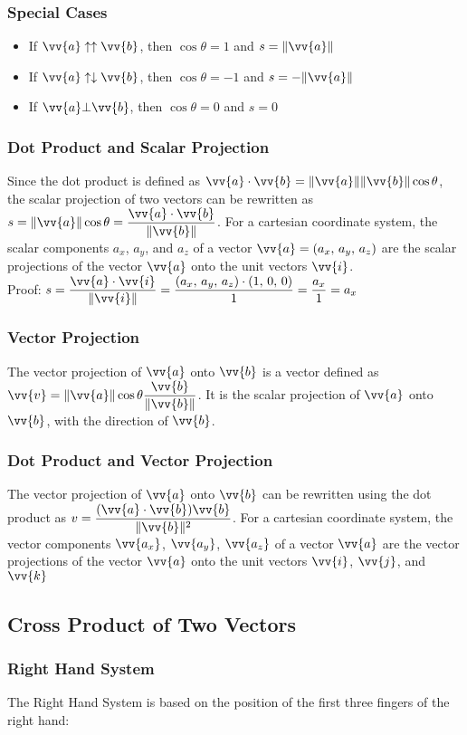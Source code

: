\documentclass{article}
\newcommand{\mv}[1]{
	\lVert\vv{#1}\rVert
}
\begin{document}
	\subsubsection{Special Cases}
	\begin{itemize}
		\item If $\vv{a}\uparrow\uparrow\vv{b}$, then $\cos\theta=1$ and $s=\mv{a}$
		\item If $\vv{a}\uparrow\downarrow\vv{b}$, then $\cos\theta=-1$ and $s=-\mv{a}$
		\item If $\vv{a}\bot\vv{b}$, then $\cos\theta=0$ and $s=0$
	\end{itemize}
	\subsubsection{Dot Product and Scalar Projection}
	Since the dot product is defined as $\vv{a}\cdot\vv{b}=\mv{a}\mv{b}\cos\theta$, the scalar projection of two vectors can be rewritten as $s=\mv{a}\cos\theta=\dfrac{\vv{a}\cdot\vv{b}}{\mv{b}}$. For a cartesian coordinate system, the scalar components $a_x$, $a_y$, and $a_z$ of a vector $\vv{a}=(a_x,\,a_y,\,a_z)$ are the scalar projections of the vector $\vv{a}$ onto the unit vectors $\vv{i}$.\\Proof: $s=\dfrac{\vv{a}\cdot\vv{i}}{\mv{i}}=\dfrac{(a_x,\,a_y,\,a_z)\cdot(1,\,0,\,0)}{1}=\dfrac{a_x}{1}=a_x$
	\subsubsection{Vector Projection}
	The vector projection of $\vv{a}$ onto $\vv{b}$ is a vector defined as $\vv{v}=\mv{a}\cos\theta\dfrac{\vv{b}}{\mv{b}}$. It is the scalar projection of $\vv{a}$ onto $\vv{b}$, with the direction of $\vv{b}$.
	\subsubsection{Dot Product and Vector Projection}
	The vector projection of $\vv{a}$ onto $\vv{b}$ can be rewritten using the dot product as $v=\dfrac{(\vv{a}\cdot\vv{b})\vv{b}}{\mv{b}^2}$. For a cartesian coordinate system, the vector components $\vv{a_x}$, $\vv{a_y}$, $\vv{a_z}$ of a vector $\vv{a}$ are the vector projections of the vector $\vv{a}$ onto the unit vectors $\vv{i}$, $\vv{j}$, and $\vv{k}$
	\subsection{Cross Product of Two Vectors}
	\subsubsection{Right Hand System}
	The Right Hand System is based on the position of the first three fingers of the right hand: %
\end{document}
